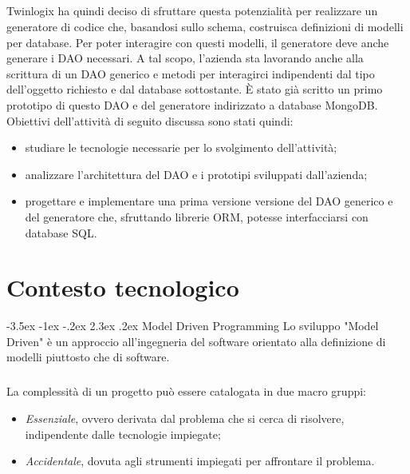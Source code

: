 \documentclass[a4paper, 12pt]{report}
\begin{document}
    \paragraph*{}
      Twinlogix ha quindi deciso di sfruttare questa potenzialità per realizzare un generatore di codice che, basandosi sullo schema, costruisca definizioni di modelli per database.
      Per poter interagire con questi modelli, il generatore deve anche generare i DAO necessari.
      A tal scopo, l'azienda sta lavorando anche alla scrittura di un DAO generico e metodi per interagirci indipendenti dal tipo dell'oggetto richiesto e dal database sottostante.
      È stato già scritto un primo prototipo di questo DAO e del generatore indirizzato a database MongoDB.
      Obiettivi dell'attività di seguito discussa sono stati quindi:
      \begin{itemize}
        \item studiare le tecnologie necessarie per lo svolgimento dell'attività;
        \item analizzare l'architettura del DAO e i prototipi sviluppati dall'azienda;
        \item progettare e implementare una prima versione versione del DAO generico e del generatore che, sfruttando librerie ORM, potesse interfacciarsi con database SQL.
      \end{itemize}
    \renewcommand\section{\@startsection{section}{1}{\z@}%
    {-3.5ex \@plus -1ex \@minus -.2ex}%
    {2.3ex \@plus.2ex}%
    {\normalfont\large\bfseries}}
  \newpage
  \tableofcontents
  \newpage
  \listoffigures
  \chapter{Contesto tecnologico}
    \section{Model Driven Programming}
      Lo sviluppo "Model Driven" è un approccio all'ingegneria del software orientato alla definizione di modelli piuttosto che di software.
      \paragraph*{}
      La complessità di un progetto può essere catalogata in due macro gruppi:
      \begin{itemize}
        \item \emph{Essenziale}, ovvero derivata dal problema che si cerca di risolvere, indipendente dalle tecnologie impiegate;
        \item \emph{Accidentale}, dovuta agli strumenti impiegati per affrontare il problema.
      \end{itemize}
\end{document}
